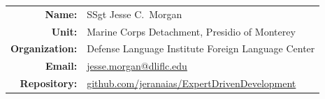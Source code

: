 \documentclass[11pt,letterpaper]{article}
\begin{document}
\begin{tabular}{rl}
  \textbf{Name:} & SSgt Jesse C.\ Morgan \\
  \textbf{Unit:} & Marine Corps Detachment, Presidio of Monterey \\
  \textbf{Organization:} & Defense Language Institute Foreign Language Center \\
  \textbf{Email:} & \href{mailto:jesse.morgan@dliflc.edu}{jesse.morgan@dliflc.edu} \\
  \textbf{Repository:} & \href{https://github.com/jeranaias/ExpertDrivenDevelopment}{github.com/jeranaias/ExpertDrivenDevelopment} \\
\end{tabular}
\end{document}
